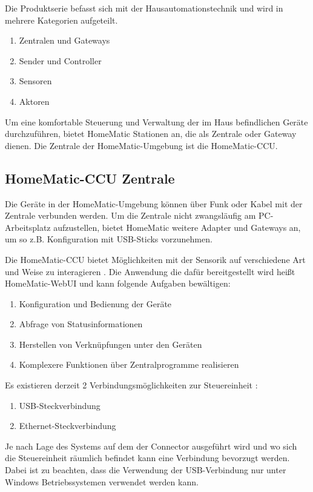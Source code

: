 Die Produktserie befasst sich mit der Hausautomationstechnik und wird in mehrere
Kategorien aufgeteilt.
\begin{enumerate}
\item{Zentralen und Gateways}
\item{Sender und Controller}
\item{Sensoren}
\item{Aktoren}
\end{enumerate}

Um eine komfortable Steuerung und Verwaltung der im Haus befindlichen Geräte durchzuführen,
bietet HomeMatic Stationen an, die als Zentrale oder Gateway dienen.
Die Zentrale der HomeMatic-Umgebung ist die HomeMatic-CCU.

\subsection{HomeMatic-CCU Zentrale}
\label{gru_hm_ccu}

Die Geräte in der HomeMatic-Umgebung können über Funk oder Kabel mit der Zentrale verbunden
werden.
Um die Zentrale nicht zwangsläufig am PC-Arbeitsplatz aufzustellen, bietet HomeMatic weitere
Adapter und Gateways an, um so z.B. Konfiguration mit USB-Sticks vorzunehmen.

Die HomeMatic-CCU bietet Möglichkeiten mit der Sensorik auf verschiedene Art und Weise zu
interagieren \cite[Seite 6]{homematic_ccu}.
Die Anwendung die dafür bereitgestellt wird heißt HomeMatic-WebUI \cite{homematic_webui_manual}
und kann folgende Aufgaben bewältigen:
\begin{enumerate}
\item Konfiguration und Bedienung der Geräte
\item Abfrage von Statusinformationen
\item Herstellen von Verknüpfungen unter den Geräten
\item Komplexere Funktionen über Zentralprogramme realisieren
\end{enumerate}

Es existieren derzeit 2 Verbindungsmöglichkeiten zur Steuereinheit \cite[Seite 10]{homematic_ccu}:
\begin{enumerate}
\item USB-Steckverbindung
\item Ethernet-Steckverbindung
\end{enumerate}

Je nach Lage des Systems auf dem der Connector ausgeführt wird und wo sich die Steuereinheit räumlich
befindet kann eine Verbindung bevorzugt werden.
Dabei ist zu beachten, dass die Verwendung der USB-Verbindung nur unter Windows Betriebssystemen
verwendet werden kann.

